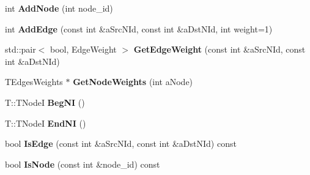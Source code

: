 \begin{DoxyCompactItemize}
\item 
\hypertarget{classall__distance__sketch_1_1graph_1_1Graph_a77bbd4ece697aadad9f29819862046f9}{}int {\bfseries Add\+Node} (int node\+\_\+id)\label{classall__distance__sketch_1_1graph_1_1Graph_a77bbd4ece697aadad9f29819862046f9}

\item 
\hypertarget{classall__distance__sketch_1_1graph_1_1Graph_ade38cb4d51123f9912048f6cbb6d4947}{}int {\bfseries Add\+Edge} (const int \&a\+Src\+N\+Id, const int \&a\+Dst\+N\+Id, int weight=1)\label{classall__distance__sketch_1_1graph_1_1Graph_ade38cb4d51123f9912048f6cbb6d4947}

\item 
\hypertarget{classall__distance__sketch_1_1graph_1_1Graph_a45a6d5d2d7d627e66090b400dcb7127e}{}std\+::pair$<$ bool, Edge\+Weight $>$ {\bfseries Get\+Edge\+Weight} (const int \&a\+Src\+N\+Id, const int \&a\+Dst\+N\+Id)\label{classall__distance__sketch_1_1graph_1_1Graph_a45a6d5d2d7d627e66090b400dcb7127e}

\item 
\hypertarget{classall__distance__sketch_1_1graph_1_1Graph_a05db9466b4cf6bbb1aab6e7b66363017}{}T\+Edges\+Weights $\ast$ {\bfseries Get\+Node\+Weights} (int a\+Node)\label{classall__distance__sketch_1_1graph_1_1Graph_a05db9466b4cf6bbb1aab6e7b66363017}

\item 
\hypertarget{classall__distance__sketch_1_1graph_1_1Graph_ad928e477aff37d0981953adb8aece737}{}T\+::\+T\+Node\+I {\bfseries Beg\+N\+I} ()\label{classall__distance__sketch_1_1graph_1_1Graph_ad928e477aff37d0981953adb8aece737}

\item 
\hypertarget{classall__distance__sketch_1_1graph_1_1Graph_ac326a690411e4f86c70b810c20af283a}{}T\+::\+T\+Node\+I {\bfseries End\+N\+I} ()\label{classall__distance__sketch_1_1graph_1_1Graph_ac326a690411e4f86c70b810c20af283a}

\item 
\hypertarget{classall__distance__sketch_1_1graph_1_1Graph_a8274ee1c9b099ada99da05e3ef98a483}{}bool {\bfseries Is\+Edge} (const int \&a\+Src\+N\+Id, const int \&a\+Dst\+N\+Id) const \label{classall__distance__sketch_1_1graph_1_1Graph_a8274ee1c9b099ada99da05e3ef98a483}

\item 
\hypertarget{classall__distance__sketch_1_1graph_1_1Graph_af60cf04a3c05dfffe37f7112b6c48b0c}{}bool {\bfseries Is\+Node} (const int \&node\+\_\+id) const \label{classall__distance__sketch_1_1graph_1_1Graph_af60cf04a3c05dfffe37f7112b6c48b0c}


\end{DoxyCompactItemize}
